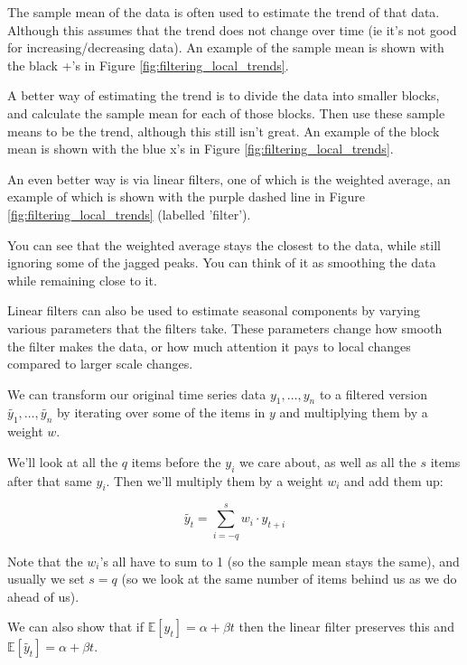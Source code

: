 \documentclass[12pt]{article}
\begin{document}
        The sample mean of the data is often used to estimate the trend of that data. Although this assumes that the trend does not change over time (ie it's not good for increasing/decreasing data).
        An example of the sample mean is shown with the black +'s in Figure \ref{fig:filtering_local_trends}.

        A better way of estimating the trend is to divide the data into smaller blocks, and calculate the sample mean for each of those blocks. Then use these sample means to be the trend, although this still isn't great.
        An example of the block mean is shown with the blue x's in Figure \ref{fig:filtering_local_trends}.

        An even better way is via linear filters, one of which is the weighted average, an example of which is shown with the purple dashed line in Figure \ref{fig:filtering_local_trends} (labelled 'filter').
        
        You can see that the weighted average stays the closest to the data, while still 
        ignoring some of the jagged peaks. You can think of it as smoothing the data while
        remaining close to it.

        Linear filters can also be used to estimate seasonal components by varying various parameters that the filters take. These parameters change how smooth the filter makes the data, or how much attention it pays to local changes compared to larger scale changes.

        We can transform our original time series data $y_1, \dots, y_n$ to a filtered
        version $\tilde{y_1}, \dots, \tilde{y_n}$ by iterating over some of the items
        in $y$ and multiplying them by a weight $w$. 

        We'll look at all the $q$ items before the $y_i$ we care about, as well as all the $s$
        items after that same $y_i$. Then we'll multiply them by a weight $w_i$ and add them
        up:

        \begin{equation*}
            \tilde{y_t} = \sum_{i = -q}^{s} w_i \cdot y_{t+i}
        \end{equation*}

        Note that the $w_i$'s all have to sum to 1 (so the sample mean stays the same), 
        and usually we set $s = q$ (so we look at the same number of items behind us 
        as we do ahead of us).

        We can also show that if $\mathbb{E}[y_t] = \alpha + \beta t$ then the linear filter
        preserves this and $\mathbb{E}[\tilde{y_t}] = \alpha + \beta t$.
\end{document}
